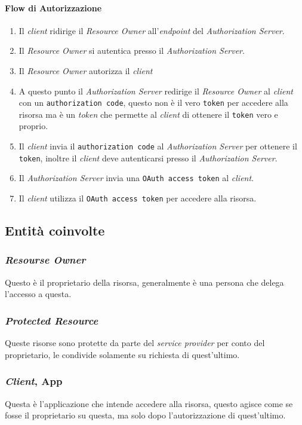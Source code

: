     \paragraph{Flow di Autorizzazione}
        \begin{enumerate}
            \item Il \textit{client} ridirige il \textit{Resource Owner} all'\textit{endpoint} del \textit{Authorization Server}.
            \item Il \textit{Resource Owner} si autentica presso il \textit{Authorization Server}.
            \item Il \textit{Resource Owner} autorizza il \textit{client}
            \item A questo punto il \textit{Authorization Server} redirige il \textit{Resource Owner} al \textit{client} con un \texttt{authorization code}, questo non è il vero \texttt{token} per accedere alla risorsa ma è un \textit{token} che permette al \textit{client} di ottenere il \texttt{token} vero e proprio.
            \item Il \textit{client} invia il \texttt{authorization code} al \textit{Authorization Server} per ottenere il \texttt{token}, inoltre il \textit{client} deve autenticarsi presso il \textit{Authorization Server}.
            \item Il \textit{Authorization Server} invia una \texttt{OAuth access token} al \textit{client}.
            \item Il \textit{client} utilizza il \texttt{OAuth access token} per accedere alla risorsa.
        \end{enumerate}
    \subsection{Entità coinvolte}
        \subsubsection{\textit{Resourse Owner}}
            Questo è il proprietario della risorsa, generalmente è una persona che delega l'accesso a questa.
        \subsubsection{\textit{Protected Resource}}
            Queste risorse sono protette da parte del \textit{service provider} per conto del proprietario, le condivide solamente su richiesta di quest'ultimo.
        \subsubsection{\textit{Client}, App}
            Questa è l'applicazione che intende accedere alla risorsa, questo agisce come se fosse il proprietario su questa, ma solo dopo l'autorizzazione di quest'ultimo.
